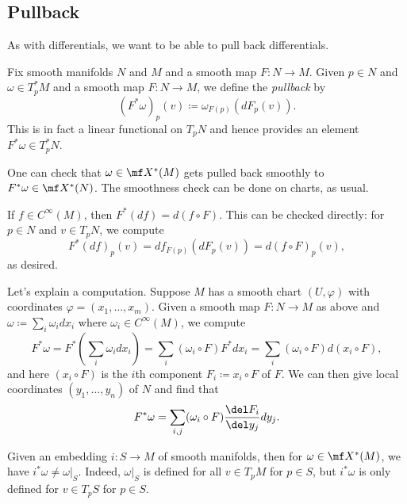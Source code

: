 \documentclass[../notes.tex]{subfiles}
\begin{document}
\subsection{Pullback}
As with differentials, we want to be able to pull back differentials.
\begin{definition}[pullback]
	Fix smooth manifolds $N$ and $M$ and a smooth map $F\colon N\to M$. Given $p\in N$ and $\omega\in T^*_pM$ and a smooth map $F\colon N\to M$, we define the \textit{pullback} by
	\[(F^*\omega)_p(v)\coloneqq \omega_{F(p)}(dF_p(v)).\]
	This is in fact a linear functional on $T_{p}N$ and hence provides an element $F^*\omega\in T^*_pN$.
\end{definition}
\begin{remark}
	One can check that $\omega\in\mf X^*(M)$ gets pulled back smoothly to $F^*\omega\in\mf X^*(N)$. The smoothness check can be done on charts, as usual.
\end{remark}
\begin{remark}
	If $f\in C^\infty(M)$, then $F^*(df)=d(f\circ F)$. This can be checked directly: for $p\in N$ and $v\in T_pN$, we compute
	\[F^*(df)_p(v)=df_{F(p)}(dF_p(v))=d(f\circ F)_p(v),\]
	as desired.
\end{remark}
\begin{remark}
	Let's explain a computation. Suppose $M$ has a smooth chart $(U,\varphi)$ with coordinates $\varphi=(x_1,\ldots,x_m)$. Given a smooth map $F\colon N\to M$ as above and $\omega\coloneqq\sum_i\omega_idx_i$ where $\omega_i\in C^\infty(M)$, we compute
	\[F^*\omega=F^*\left(\sum_i\omega_idx_i\right)=\sum_i(\omega_i\circ F)F^*dx_i=\sum_i(\omega_i\circ F)d(x_i\circ F),\]
	and here $(x_i\circ F)$ is the $i$th component $F_i\coloneqq x_i\circ F$ of $F$. We can then give local coordinates $(y_1,\ldots,y_n)$ of $N$ and find that
	\[F^*\omega=\sum_{i,j}(\omega_i\circ F)\frac{\del F_i}{\del y_j}dy_j.\]
\end{remark}
\begin{remark}
	Given an embedding $i\colon S\to M$ of smooth manifolds, then for $\omega\in\mf X^*(M)$, we have $i^*\omega\ne \omega|_S$. Indeed, $\omega|_S$ is defined for all $v\in T_pM$ for $p\in S$, but $i^*\omega$ is only defined for $v\in T_pS$ for $p\in S$.
\end{remark}
\end{document}
